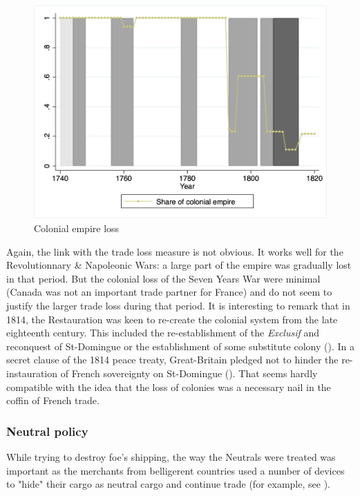 \documentclass[12pt,a4paper,notitlepage,english]{article}
\begin{document}
\begin{center}
\begin{figure}[H]
\caption{Colonial empire loss}
\label{colony_loss}
\centering
\includegraphics[scale=.51]{colony_loss.png}
\end{figure}
\end{center}
Again, the link with the trade loss measure is not obvious. It works well for the Revolutionnary \& Napoleonic Wars: a large part of the empire was gradually lost in that period. But the colonial loss of the Seven Years War were minimal (Canada was not an important trade partner for France) and do not seem to justify the larger trade loss during that period.
It is interesting to remark that in 1814, the Restauration was keen to re-create the colonial system from the late eighteenth century.
This included the re-establishment of the \textit{Exclusif} and reconquest of St-Domingue or the establishment of some substitute colony (\cite{Todd2011}).
In a secret clause of the 1814 peace treaty, Great-Britain pledged not to hinder the re-instauration of French sovereignty on St-Domingue (\cite{Schefer1907}).
That seems hardly compatible with the idea that the loss of colonies was a necessary nail in the coffin of French trade.

\subsubsection{Neutral policy}
While trying to destroy foe's shipping, the way the Neutrals were treated was important as the merchants from belligerent countries used a number of devices to "hide" their cargo as neutral cargo and continue trade (for example, see \cite{Carriere1973,Schnakenbourg2013,Schnakenbourg2015}).
\end{document}
